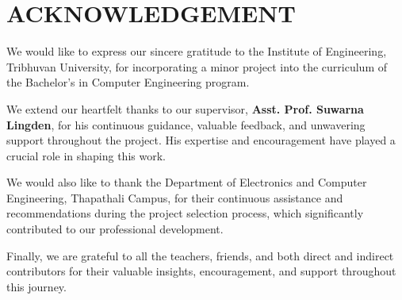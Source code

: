 \chapter*{ACKNOWLEDGEMENT}
{}

We would like to express our sincere gratitude to the Institute of Engineering, Tribhuvan University, for incorporating a minor project into the curriculum of the Bachelor's in Computer Engineering program.

We extend our heartfelt thanks to our supervisor, \textbf{Asst. Prof. Suwarna Lingden}, for his continuous guidance, valuable feedback, and unwavering support throughout the project. His expertise and encouragement have played a crucial role in shaping this work.

We would also like to thank the Department of Electronics and Computer Engineering, Thapathali Campus, for their continuous assistance and recommendations during the project selection process, which significantly contributed to our professional development.

Finally, we are grateful to all the teachers, friends, and both direct and indirect contributors for their valuable insights, encouragement, and support throughout this journey.

\vspace{1em}
\noindent \authorTable








